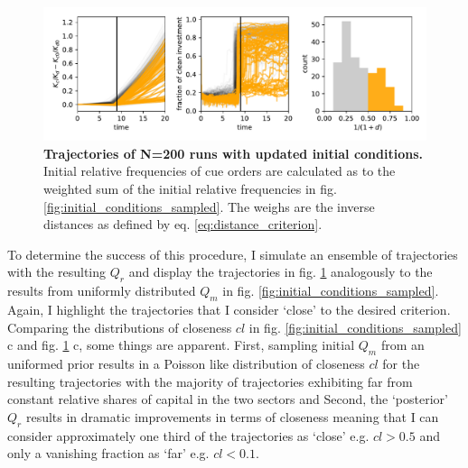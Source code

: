 \begin{figure}[t]
  \centering
  \includegraphics[width= \textwidth]{figures/initial_condition_fitted.pdf}
  \caption{\textbf{Trajectories of N=200 runs with updated initial conditions.} Initial relative frequencies of cue orders are calculated as to the weighted sum of the initial relative frequencies in fig. \ref{fig:initial_conditions_sampled}. The weighs are the inverse distances as defined by eq. \ref{eq:distance_criterion}.}
  \label{fig:initial_conditions_fitted}
\end{figure}

To determine the success of this procedure, I simulate an ensemble of trajectories with the resulting $Q_r$ and display the trajectories in fig. \ref{fig:initial_conditions_fitted} analogously to the results from uniformly distributed $Q_m$ in fig. \ref{fig:initial_conditions_sampled}. Again, I highlight the trajectories that I consider `close' to the desired criterion. Comparing the distributions of closeness $cl$ in fig. \ref{fig:initial_conditions_sampled} c and fig. \ref{fig:initial_conditions_fitted} c, some things are apparent. First, sampling initial $Q_m$ from an uniformed prior results in a Poisson like distribution of closeness $cl$ for the resulting trajectories with the majority of trajectories exhibiting far from constant relative shares of capital in the two sectors and Second, the `posterior' $Q_r$ results in dramatic improvements in terms of closeness meaning that I can consider approximately one third of the trajectories as `close' e.g. $cl>0.5$ and only a vanishing fraction as `far' e.g. $cl<0.1$.\\


